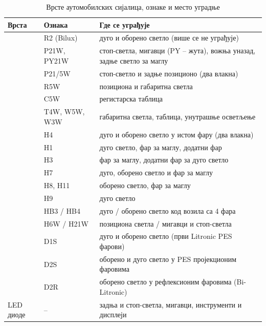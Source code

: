 \documentclass{report}
\begin{document}
\begin{table}[!htb]
    \centering
    \small
    \renewcommand{\arraystretch}{1.2}
    \begin{tabular}{|>{\raggedright\arraybackslash}p{2.5cm}|p{2.3cm}|>{\raggedright\arraybackslash}p{9cm}|}
        \hline
        \textbf{Врста} & \textbf{Ознака} & \textbf{Где се уграђује} \\
        \hline\hline
        \multirow{6}{=}{Са ужареним влакном}
            & R2 (Bilux)     & дуго и оборено светло (више се не уграђује) \\ \cline{2-3}
            & P21W, PY21W    & стоп-светла, мигавци (PY -- жута), вожња уназад, задње светло за маглу \\ \cline{2-3}
            & P21/5W         & стоп-светло и задње позиционо (два влакна) \\ \cline{2-3}
            & R5W            & позициона и габаритна светла \\ \cline{2-3}
            & C5W            & регистарска таблица \\ \cline{2-3}
            & T4W, W5W, W3W  & габаритна светла, таблица, унутрашње осветљење \\
        \hline
        \multirow{8}{=}{Халогене}
            & H4             & дуго и оборено светло у истом фару (два влакна) \\ \cline{2-3}
            & H1             & дуго светло, фар за маглу, додатни фар \\ \cline{2-3}
            & H3             & фар за маглу, додатни фар за дуго светло \\ \cline{2-3}
            & H7             & дуго, оборено светло и фар за маглу \\ \cline{2-3}
            & H8, H11        & оборено светло, фар за маглу \\ \cline{2-3}
            & H9             & дуго светло \\ \cline{2-3}
            & HB3 / HB4      & дуго / оборено светло код возила са 4 фара \\ \cline{2-3}
            & H6W / H21W     & позициона светла / мигавци и стоп-светла \\
        \hline
        \multirow{3}{=}{Гасне (Litronic)}
            & D1S            & дуго и оборено светло (први Litronic PES фарови) \\ \cline{2-3}
            & D2S            & оборено и дуго светло у PES пројекционим фаровима \\ \cline{2-3}
            & D2R            & оборено светло у рефлексионим фаровима (Bi-Litronic) \\
        \hline
        LED диоде      & --             & задња и стоп-светла, мигавци, инструменти и дисплеји \\
        \hline
    \end{tabular}
    \caption{Врсте аутомобилских сијалица, ознаке и место уградње}
    \label{tab:vrste-sijalica}
\end{table}
\end{document}
